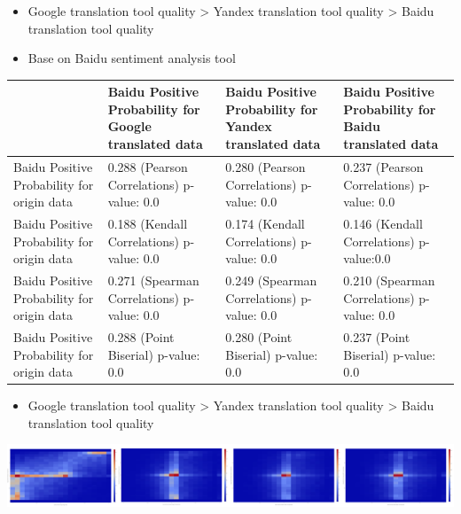 \documentclass[conference,compsoc]{IEEEtran}
\begin{document}
\begin{itemize}
\item Google translation tool quality > Yandex translation tool quality > Baidu translation tool quality
\end{itemize}
\begin{itemize}
\item Base on Baidu sentiment analysis tool
\end{itemize}
\begin{center}
\begin{tabular}{llll}
 & Baidu Positive Probability for Google translated data & Baidu Positive Probability for Yandex translated data & Baidu Positive Probability for Baidu translated data\\
\hline
Baidu Positive Probability for origin data & 0.288 (Pearson Correlations)  p-value: 0.0 & 0.280 (Pearson Correlations)  p-value: 0.0 & 0.237 (Pearson Correlations)   p-value: 0.0\\
Baidu Positive Probability for origin data & 0.188 (Kendall Correlations)  p-value: 0.0 & 0.174 (Kendall Correlations) p-value: 0.0 & 0.146 (Kendall Correlations) p-value:0.0\\
Baidu Positive Probability for origin data & 0.271 (Spearman Correlations)  p-value: 0.0 & 0.249 (Spearman Correlations) p-value: 0.0 & 0.210 (Spearman Correlations) p-value: 0.0\\
Baidu Positive Probability for origin data & 0.288 (Point Biserial) p-value: 0.0 & 0.280 (Point Biserial) p-value: 0.0 & 0.237 (Point Biserial) p-value: 0.0\\
\end{tabular}
\end{center}

\begin{itemize}
\item Google translation tool quality > Yandex translation tool quality > Baidu translation tool quality
\end{itemize}
\begin{center}
\includegraphics[width=.9\linewidth]{../img/heatmap.png}
\end{center}
\end{document}
